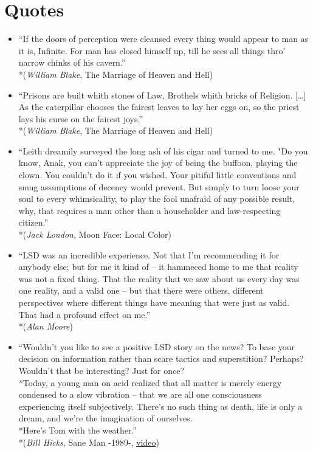 \documentclass{article}
\begin{document}
\section{Quotes}
\begin{itemize}
	\item ``If the doors of perception were cleansed every thing would
	appear to man as it is, Infinite. For man has closed himself up, till
	he sees all things thro' narrow chinks of his cavern.''
	\\*(\emph{William Blake}, The Marriage of Heaven and Hell)
	
	\item ``Prisons are built whith stones of Law, Brothels whith bricks of
	Religion. [\ldots] As the caterpillar chooses the fairest leaves to lay
	her eggs on, so the priest lays his curse on the fairest joys.''
	\\*(\emph{William Blake}, The Marriage of Heaven and Hell)
	
	\item ``Leith dreamily surveyed the long ash of his cigar and turned to 
	me. "Do you know, Anak, you can't appreciate the joy of being the
	buffoon, playing the clown. You couldn't do it if you wished.
	Your pitiful little conventions and smug assumptions of decency would
	prevent. But simply to turn loose your soul to every whimsicality,
	to play the fool unafraid of any possible result, why, that requires a
	man other than a householder and law-respecting citizen.''
	\\*(\emph{Jack London}, Moon Face: Local Color)
	
	\item ``LSD was an incredible experience. Not that I’m recommending it
	for anybody else; but for me it kind of – it hammeced home to me that
	reality was not a fixed thing. That the reality that we saw about us
	every day was one reality, and a valid one – but that there were 
	others, different perspectives where different things have meaning that
	were just as valid. That had a profound effect on me.''
	\\*(\emph{Alan Moore})
	
	\item ``Wouldn't you like to see a positive LSD story on the news?
	To base your decision on information rather than scare tactics and
	superstition? Perhaps? Wouldn't that be interesting? Just for once?
	\\*Today, a young man on acid realized that all matter is merely energy
	condensed to a slow vibration – that we are all one consciousness
	experiencing itself subjectively. There's no such thing as death, life
	is only a dream, and we're the imagination of ourselves.
	\\*Here's Tom with the weather.''
	\\*(\emph{Bill Hicks}, Sane Man -1989-, \href{http://www.youtube.com/watch?v=7D0BeLz5blM}{video})
\end{itemize}
\end{document}
